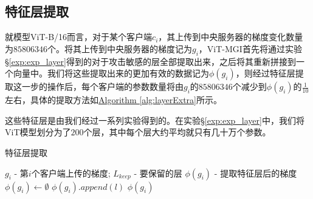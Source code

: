 \documentclass[conference]{IEEEtran}
\begin{document}
\subsection{特征层提取}
\label{sec:method_layer}

就模型ViT-B/16而言，对于某个客户端$c_i$，其上传到中央服务器的梯度变化数量为$85806346$个。将其上传到中央服务器的梯度记为$g_i$，ViT-MGI首先将通过实验\hyperref[exp:exp_layer]{§\ref{exp:exp_layer}}得到的对于攻击敏感的层全部提取出来，之后将其重新拼接到一个向量中。我们将这些提取出来的更加有效的数据记为$\phi(g_i)$，则经过特征层提取这一步的操作后，每个客户端的参数数量将由$g_i$的$85806346$个减少到$\phi(g_i)$的$\frac1{10}$左右，具体的提取方法如\hyperref[alg:layerExtra]{Algorithm \ref{alg:layerExtra}}所示。

这些特征层是由我们经过一系列实验得到的。在实验\hyperref[exp:exp_layer]{§\ref{exp:exp_layer}}中，我们将ViT模型划分为了$200$个层，其中每个层大约平均就只有几十万个参数。


\begin{algorithm}
    \caption{特征层提取}
    \label{alg:layerExtra}
    \begin{algorithmic}[1]
        \Require $g_i$ - 第$i$个客户端上传的梯度; $L_{keep}$ - 要保留的层
        \Ensure $\phi(g_i)$ - 提取特征层后的梯度
            \State $\phi(g_i)\gets\emptyset$
                    \State $\phi(g_i).append(l)$
                \EndIf
            \EndFor
            \State \Return $\phi(g_i)$
        \EndFunction
    \end{algorithmic}
\end{algorithm}
\end{document}
